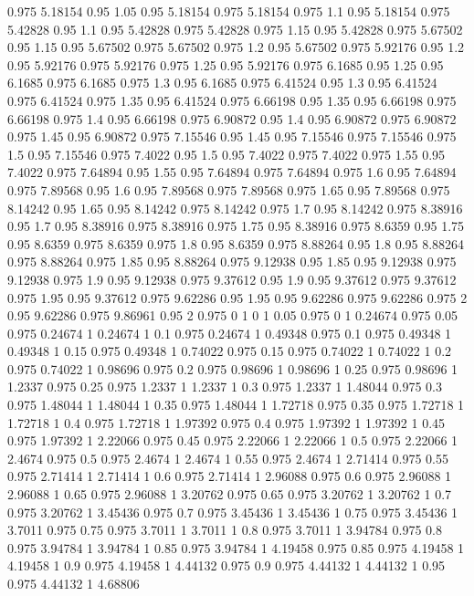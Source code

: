 0.975 5.18154
0.95 1.05
0.95 5.18154
0.975 5.18154
0.975 1.1
0.95 5.18154
0.975 5.42828
0.95 1.1
0.95 5.42828
0.975 5.42828
0.975 1.15
0.95 5.42828
0.975 5.67502
0.95 1.15
0.95 5.67502
0.975 5.67502
0.975 1.2
0.95 5.67502
0.975 5.92176
0.95 1.2
0.95 5.92176
0.975 5.92176
0.975 1.25
0.95 5.92176
0.975 6.1685
0.95 1.25
0.95 6.1685
0.975 6.1685
0.975 1.3
0.95 6.1685
0.975 6.41524
0.95 1.3
0.95 6.41524
0.975 6.41524
0.975 1.35
0.95 6.41524
0.975 6.66198
0.95 1.35
0.95 6.66198
0.975 6.66198
0.975 1.4
0.95 6.66198
0.975 6.90872
0.95 1.4
0.95 6.90872
0.975 6.90872
0.975 1.45
0.95 6.90872
0.975 7.15546
0.95 1.45
0.95 7.15546
0.975 7.15546
0.975 1.5
0.95 7.15546
0.975 7.4022
0.95 1.5
0.95 7.4022
0.975 7.4022
0.975 1.55
0.95 7.4022
0.975 7.64894
0.95 1.55
0.95 7.64894
0.975 7.64894
0.975 1.6
0.95 7.64894
0.975 7.89568
0.95 1.6
0.95 7.89568
0.975 7.89568
0.975 1.65
0.95 7.89568
0.975 8.14242
0.95 1.65
0.95 8.14242
0.975 8.14242
0.975 1.7
0.95 8.14242
0.975 8.38916
0.95 1.7
0.95 8.38916
0.975 8.38916
0.975 1.75
0.95 8.38916
0.975 8.6359
0.95 1.75
0.95 8.6359
0.975 8.6359
0.975 1.8
0.95 8.6359
0.975 8.88264
0.95 1.8
0.95 8.88264
0.975 8.88264
0.975 1.85
0.95 8.88264
0.975 9.12938
0.95 1.85
0.95 9.12938
0.975 9.12938
0.975 1.9
0.95 9.12938
0.975 9.37612
0.95 1.9
0.95 9.37612
0.975 9.37612
0.975 1.95
0.95 9.37612
0.975 9.62286
0.95 1.95
0.95 9.62286
0.975 9.62286
0.975 2
0.95 9.62286
0.975 9.86961
0.95 2
0.975 0
1 0
1 0.05
0.975 0
1 0.24674
0.975 0.05
0.975 0.24674
1 0.24674
1 0.1
0.975 0.24674
1 0.49348
0.975 0.1
0.975 0.49348
1 0.49348
1 0.15
0.975 0.49348
1 0.74022
0.975 0.15
0.975 0.74022
1 0.74022
1 0.2
0.975 0.74022
1 0.98696
0.975 0.2
0.975 0.98696
1 0.98696
1 0.25
0.975 0.98696
1 1.2337
0.975 0.25
0.975 1.2337
1 1.2337
1 0.3
0.975 1.2337
1 1.48044
0.975 0.3
0.975 1.48044
1 1.48044
1 0.35
0.975 1.48044
1 1.72718
0.975 0.35
0.975 1.72718
1 1.72718
1 0.4
0.975 1.72718
1 1.97392
0.975 0.4
0.975 1.97392
1 1.97392
1 0.45
0.975 1.97392
1 2.22066
0.975 0.45
0.975 2.22066
1 2.22066
1 0.5
0.975 2.22066
1 2.4674
0.975 0.5
0.975 2.4674
1 2.4674
1 0.55
0.975 2.4674
1 2.71414
0.975 0.55
0.975 2.71414
1 2.71414
1 0.6
0.975 2.71414
1 2.96088
0.975 0.6
0.975 2.96088
1 2.96088
1 0.65
0.975 2.96088
1 3.20762
0.975 0.65
0.975 3.20762
1 3.20762
1 0.7
0.975 3.20762
1 3.45436
0.975 0.7
0.975 3.45436
1 3.45436
1 0.75
0.975 3.45436
1 3.7011
0.975 0.75
0.975 3.7011
1 3.7011
1 0.8
0.975 3.7011
1 3.94784
0.975 0.8
0.975 3.94784
1 3.94784
1 0.85
0.975 3.94784
1 4.19458
0.975 0.85
0.975 4.19458
1 4.19458
1 0.9
0.975 4.19458
1 4.44132
0.975 0.9
0.975 4.44132
1 4.44132
1 0.95
0.975 4.44132
1 4.68806
